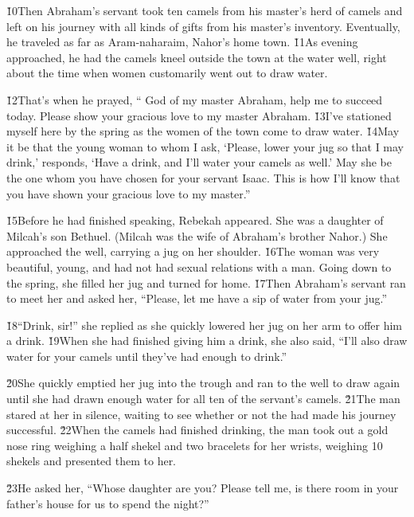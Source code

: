 \v{10}Then Abraham's servant took ten camels from his master's herd of camels and left on his journey with all kinds of gifts from his master's inventory. Eventually, he traveled as far as Aram-naharaim, Nahor's home town. \v{11}As evening approached, he had the camels kneel outside the town at the water well, right about the time when women customarily went out to draw water.

\v{12}That's when he prayed, `` God of my master Abraham, help me to succeed today. Please show your gracious love to my master Abraham. \v{13}I've stationed myself here by the spring as the women of the town come to draw water. \v{14}May it be that the young woman to whom I ask, `Please, lower your jug so that I may drink,' responds, `Have a drink, and I'll water your camels as well.' May she be the one whom you have chosen for your servant Isaac. This is how I'll know that you have shown your gracious love to my master.''

\v{15}Before he had finished speaking, Rebekah appeared. She was a daughter of Milcah's son Bethuel. (Milcah was the wife of Abraham's brother Nahor.) She approached the well, carrying a jug on her shoulder. \v{16}The woman was very beautiful, young, and had not had sexual relations with a man. Going down to the spring, she filled her jug and turned for home. \v{17}Then Abraham's servant ran to meet her and asked her, ``Please, let me have a sip of water from your jug.''

\v{18}``Drink, sir!'' she replied as she quickly lowered her jug on her arm to offer him a drink. \v{19}When she had finished giving him a drink, she also said, ``I'll also draw water for your camels until they've had enough to drink.''

\v{20}She quickly emptied her jug into the trough and ran to the well to draw again until she had drawn enough water for all ten of the servant's camels. \v{21}The man stared at her in silence, waiting to see whether or not the  had made his journey successful. \v{22}When the camels had finished drinking, the man took out a gold nose ring weighing a half shekel and two bracelets for her wrists, weighing 10 shekels and presented them to her.

\v{23}He asked her, ``Whose daughter are you? Please tell me, is there room in your father's house for us to spend the night?''

